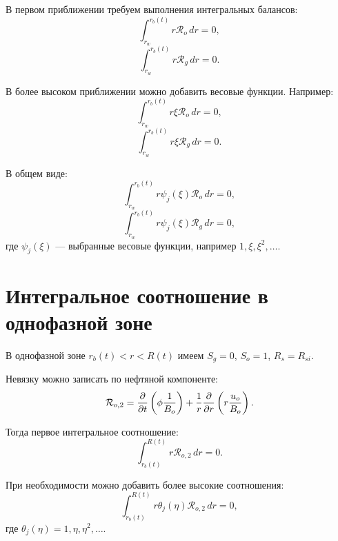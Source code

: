 \documentclass[12pt,a4paper]{article}
\begin{document}
В первом приближении требуем выполнения интегральных балансов:
\begin{equation}
    \int_{r_w}^{r_b(t)} r\mathcal{R}_o\,dr = 0,
\end{equation}
\begin{equation}
    \int_{r_w}^{r_b(t)} r\mathcal{R}_g\,dr = 0.
\end{equation}

В более высоком приближении можно добавить весовые функции. Например:
\begin{equation}
    \int_{r_w}^{r_b(t)} r\xi\mathcal{R}_o\,dr = 0,
\end{equation}
\begin{equation}
    \int_{r_w}^{r_b(t)} r\xi\mathcal{R}_g\,dr = 0.
\end{equation}

В общем виде:
\begin{equation}
    \int_{r_w}^{r_b(t)} r\psi_j(\xi)\mathcal{R}_o\,dr = 0,
\end{equation}
\begin{equation}
    \int_{r_w}^{r_b(t)} r\psi_j(\xi)\mathcal{R}_g\,dr = 0,
\end{equation}
где $\psi_j(\xi)$ --- выбранные весовые функции, например $1,\xi,\xi^2,\ldots$.

\section{Интегральное соотношение в однофазной зоне}

В однофазной зоне $r_b(t)<r<R(t)$ имеем $S_g=0$, $S_o=1$, $R_s=R_{si}$.

Невязку можно записать по нефтяной компоненте:
\begin{equation}
    \mathcal{R}_{o,2}
    =
    \pdv{}{t}
    \left(
        \phi \frac{1}{B_o}
    \right)
    +
    \frac{1}{r}\pdv{}{r}
    \left(
        r \frac{u_o}{B_o}
    \right).
\end{equation}

Тогда первое интегральное соотношение:
\begin{equation}
    \int_{r_b(t)}^{R(t)} r\mathcal{R}_{o,2}\,dr = 0.
\end{equation}

При необходимости можно добавить более высокие соотношения:
\begin{equation}
    \int_{r_b(t)}^{R(t)} r\theta_j(\eta)\mathcal{R}_{o,2}\,dr = 0,
\end{equation}
где $\theta_j(\eta)=1,\eta,\eta^2,\ldots$.
\end{document}
